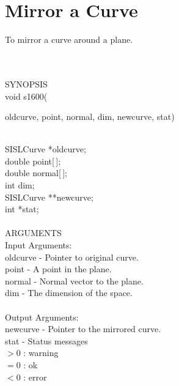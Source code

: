 \section{Mirror a Curve}
\begin{minipg1}
  To mirror a curve around a plane.
\end{minipg1} \\ \\
SYNOPSIS\\
        \>void s1600(\begin{minipg3}
                {\fov oldcurve}, {\fov point}, {\fov normal}, {\fov dim}, {\fov newcurve}, {\fov stat})
                \end{minipg3}\\[0.3ex]
                \>\>    SISLCurve       \>      *{\fov oldcurve};\\
                \>\>    double  \>      {\fov point}[\,];\\
                \>\>    double  \>      {\fov normal}[\,];\\
                \>\>    int     \>      {\fov dim};\\
                \>\>    SISLCurve       \>      **{\fov newcurve};\\
                \>\>    int     \>      *{\fov stat};\\
\\
ARGUMENTS\\
        \>Input Arguments:\\
        \>\>    {\fov oldcurve}\> - \>  Pointer to original curve.\\
        \>\>    {\fov point}    \> - \> A point in the plane.\\
        \>\>    {\fov normal}   \> - \> Normal vector to the plane.\\
        \>\>    {\fov dim}      \> - \> The dimension of the space.\\
\\
        \>Output Arguments:\\
        \>\>    {\fov newcurve}\> - \>  Pointer to the mirrored curve.\\
        \>\>    {\fov stat}     \> - \> Status messages\\
                \>\>\>\>\>              $> 0$   : warning\\
                \>\>\>\>\>              $= 0$   : ok\\
                \>\>\>\>\>              $< 0$   : error\\

